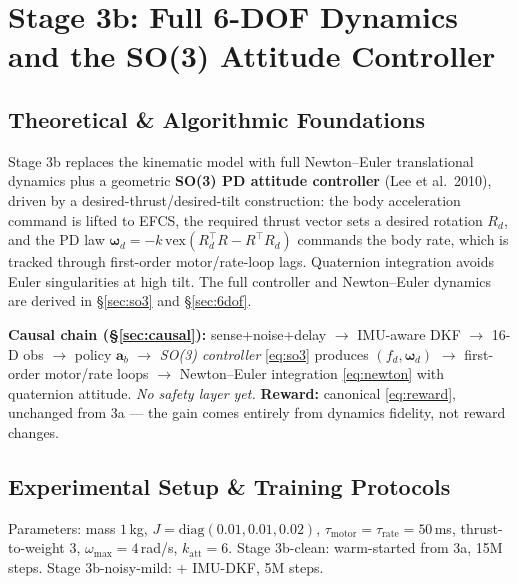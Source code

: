 \documentclass[11pt]{article}
\newcommand{\stagebox}[1]{\vspace{2pt}\noindent\colorbox{boxgray}{%
\parbox{\dimexpr\linewidth-2\fboxsep}{\small #1}}\vspace{4pt}}
\begin{document}
\section{Stage 3b: Full 6-DOF Dynamics and the SO(3) Attitude Controller}
\label{sec:3b}
\subsection{Theoretical \& Algorithmic Foundations}
Stage 3b replaces the kinematic model with full Newton--Euler translational
dynamics plus a geometric \textbf{SO(3) PD attitude controller}
(Lee et al.\ 2010), driven by a desired-thrust/desired-tilt construction:
the body acceleration command is lifted to EFCS, the required thrust vector
sets a desired rotation $R_d$, and the PD law
$\bm\omega_d=-k\,\mathrm{vex}(R_d^\top R - R^\top R_d)$ commands the body rate,
which is tracked through first-order motor/rate-loop lags. Quaternion
integration avoids Euler singularities at high tilt. The full controller and
Newton--Euler dynamics are derived in \S\ref{sec:so3} and \S\ref{sec:6dof}.

\stagebox{\textbf{Causal chain (\S\ref{sec:causal}):} sense+noise+delay
$\rightarrow$ IMU-aware DKF $\rightarrow$ 16-D obs $\rightarrow$ policy
$\mathbf a_b$ $\rightarrow$ \emph{SO(3) controller} \eqref{eq:so3} produces
$(f_d,\bm\omega_d)$ $\rightarrow$ first-order motor/rate loops $\rightarrow$
Newton--Euler integration \eqref{eq:newton} with quaternion attitude.
\emph{No safety layer yet.} \textbf{Reward:} canonical \eqref{eq:reward},
unchanged from 3a --- the gain comes entirely from dynamics fidelity, not
reward changes.}

\subsection{Experimental Setup \& Training Protocols}
Parameters: mass $1\,$kg, $J=\mathrm{diag}(0.01,0.01,0.02)$, $\tau_\text{motor}
=\tau_\text{rate}=50\,$ms, thrust-to-weight 3, $\omega_\text{max}=4\,$rad/s,
$k_\text{att}=6$. Stage 3b-clean: warm-started from 3a, 15M steps. Stage
3b-noisy-mild: + IMU-DKF, 5M steps.
\end{document}
